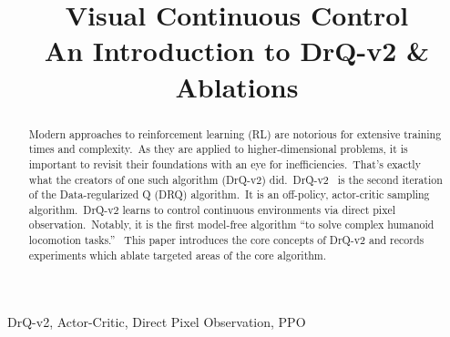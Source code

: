 \documentclass[conference]{./IEEEtran/IEEEtran} %
\begin{document}
    \title{Visual Continuous Control \\ {\large An Introduction to DrQ-v2 \& Ablations}}

    \author{
        \and
        \and
    }

    \maketitle

    \begin{abstract}
        Modern approaches to reinforcement learning (RL) are notorious for extensive training times and complexity.\ As
        they are applied to higher-dimensional problems, it is important to revisit their foundations with an eye for
        inefficiencies.\ That's exactly what the creators of one such algorithm (DrQ-v2) did.\ DrQ-v2~\cite{DrQv2} is
        the second iteration of the Data-regularized Q (DRQ) algorithm.\ It is an off-policy, actor-critic sampling
        algorithm.\ DrQ-v2 learns to control continuous environments via direct pixel observation.\ Notably, it is the
        first model-free algorithm \enquote{to solve complex humanoid locomotion tasks.}~\cite{DrQv2} This paper
        introduces the core concepts of DrQ-v2 and records experiments which ablate targeted areas of the core
        algorithm.
    \end{abstract}

    \begin{IEEEkeywords}
        DrQ-v2, Actor-Critic, Direct Pixel Observation, PPO
    \end{IEEEkeywords}
\end{document}
